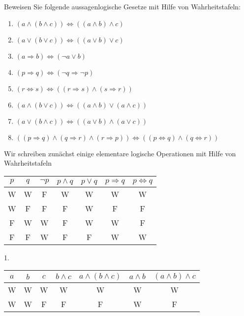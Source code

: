 \documentclass[12pt]{exam}
\begin{document}
\begin{questions}



Beweisen Sie folgende aussagenlogische Gesetze mit Hilfe von Wahrheitstafeln:
\begin{enumerate}
	\item $(a\wedge(b\wedge c))\Leftrightarrow((a\wedge b)\wedge c)$
	\item $(a\vee(b\vee c))\Leftrightarrow((a\vee b)\vee c)$
	\item $(a\Rightarrow b)\Leftrightarrow(\neg a\vee b)$
	\item $(p\Rightarrow q)\Leftrightarrow(\neg q\Rightarrow\neg p)$
	\item $(r\Leftrightarrow s)\Leftrightarrow((r\Rightarrow s)\wedge (s\Rightarrow r))$
	\item $(a\wedge(b\vee c))\Leftrightarrow((a\wedge b)\vee(a\wedge c))$
	\item $(a\vee(b\wedge c))\Leftrightarrow((a\vee b)\wedge(a\vee c))$
	\item $((p\Rightarrow q)\wedge(q\Rightarrow r)\wedge(r\Rightarrow p))\Leftrightarrow((p\Leftrightarrow q)\wedge(q\Leftrightarrow r))$
\end{enumerate}
\begin{solution}
	Wir schreiben zunächst einige elementare logische Operationen mit Hilfe von Wahrheitstafeln
	\begin{center}
		\begin{tabular}{|c|c|c|c|c|c|c|}
			\hline $p$ & $q$ & $\neg p$ & $p\land q$ & $p\lor q$ & $p\Rightarrow q$ & $p\Leftrightarrow q$\\
			\hline W&W&F&W&W&W&W\\
			\hline W&F&F&F&W&F&F\\
			\hline F&W&W&F&W&W&F\\
			\hline F&F&W&F&F&W&W\\
			\hline
		\end{tabular}
	\end{center}
	1.
	\begin{center}
		\begin{tabular}{|c|c|c|c|c|c|c|}
			\hline $a$ & $b$ & $c$ & $b\land c$ & $a\land (b\land c)$ & $a\land b$ & $(a\land b)\land c$\\
			\hline W&W&W&W&W&W&W\\
			\hline W&W&F&F&F&W&F\\

\end{tabular}
\end{center}
\end{solution}
\end{questions}
\end{document}
